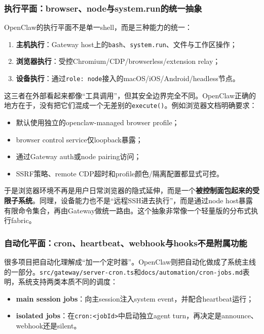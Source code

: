 \documentclass[12pt,a4paper]{article}
\begin{document}
\subsubsection{执行平面：browser、node与system.run的统一抽象}

OpenClaw的执行平面不是单一shell，而是三种能力的统一：

\begin{enumerate}
    \item \textbf{主机执行}：Gateway host上的\texttt{bash}、\texttt{system.run}、文件与工作区操作；
    \item \textbf{浏览器执行}：受控Chromium/CDP/browserless/extension relay；
    \item \textbf{设备执行}：通过\texttt{role: node}接入的macOS/iOS/Android/headless节点。
\end{enumerate}

这三者在外部看起来都像“工具调用”，但其安全边界完全不同。OpenClaw正确的地方在于，没有把它们混成一个无差别的\texttt{execute()}。例如浏览器文档明确要求：
\begin{itemize}
    \item 默认使用独立的openclaw-managed browser profile；
    \item browser control service仅loopback暴露；
    \item 通过Gateway auth或node pairing访问；
    \item SSRF策略、remote CDP超时和profile颜色/隔离配置都显式可控。
\end{itemize}

于是浏览器环境不再是用户日常浏览器的隐式延伸，而是一个\textbf{被控制面包起来的受限子系统}。同理，设备能力也不是“远程SSH进去执行”，而是通过node host暴露有限命令集合，再由Gateway做统一路由。这个抽象非常像一个轻量版的分布式执行fabric。

\subsubsection{自动化平面：cron、heartbeat、webhook与hooks不是附属功能}

很多项目把自动化理解成“加一个定时器”。OpenClaw则把自动化做成了系统主线的一部分。\texttt{src/gateway/server-cron.ts}和\texttt{docs/automation/cron-jobs.md}表明，系统支持两类本质不同的调度：

\begin{itemize}
    \item \textbf{main session jobs}：向主session注入system event，并配合heartbeat运行；
    \item \textbf{isolated jobs}：在\texttt{cron:<jobId>}中启动独立agent turn，再决定是announce、webhook还是silent。
\end{itemize}
\end{document}
